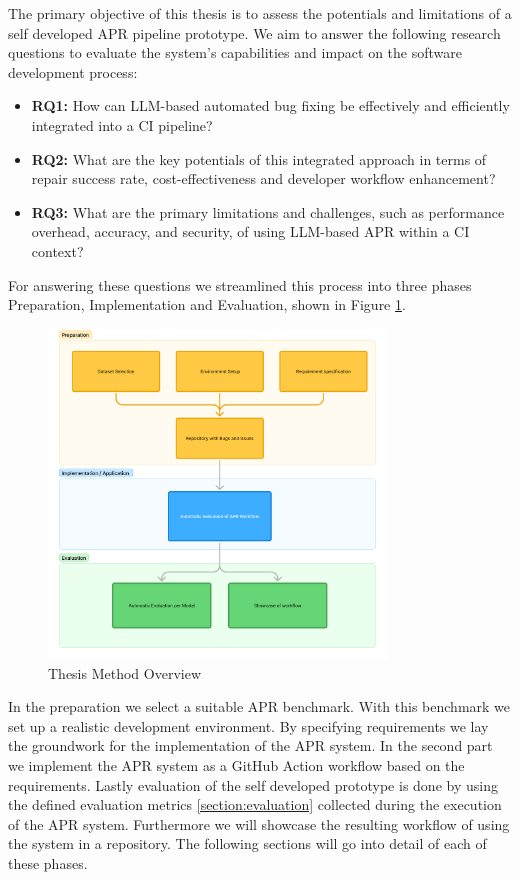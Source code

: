 The primary objective of this thesis is to assess the potentials and limitations of a self developed APR pipeline prototype. We aim to answer the following research questions to evaluate the system's capabilities and impact on the software development process:

\begin{itemize}
    \item \textbf{RQ1:} How can LLM-based automated bug fixing be effectively and efficiently integrated into a CI pipeline?
    \item \textbf{RQ2:} What are the key potentials of this integrated approach in terms of repair success rate, cost-effectiveness and developer workflow enhancement?
    \item \textbf{RQ3:} What are the primary limitations and challenges, such as performance overhead, accuracy, and security, of using LLM-based APR within a CI context?
\end{itemize}

For answering these questions we streamlined this process into three phases Preparation, Implementation and Evaluation, shown in Figure \ref{fig:method-overview}.

\begin{figure}[H]
    \centering
    \includegraphics[width=0.8\textwidth]{images/flowcharts/method.png}
    \caption{Thesis Method Overview}
    \label{fig:method-overview}
\end{figure}

In the preparation we select a suitable APR benchmark. With this benchmark we set up a realistic development environment. By specifying requirements we lay the groundwork for the implementation of the APR system.
In the second part we implement the APR system as a GitHub Action workflow based on the requirements.
Lastly evaluation of the self developed prototype is done by using the defined evaluation metrics \ref{section:evaluation} collected during the execution of the APR system. Furthermore we will showcase the resulting workflow of using the system in a repository.
The following sections will go into detail of each of these phases.

